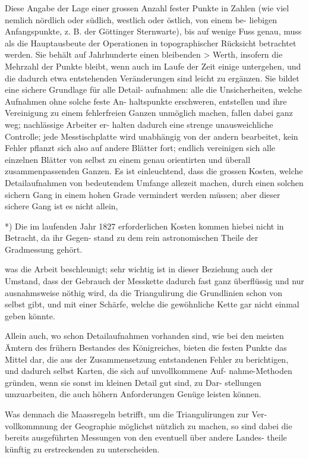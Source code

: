 \documentclass[12pt,a4paper]{article}
\theoremstyle{plain}
\theoremstyle{definition}
\theoremstyle{remark}
\begin{document}
\noindent
Diese Angabe der Lage einer grossen Anzahl fester Punkte in Zahlen
(wie viel nemlich nördlich oder südlich, westlich oder östlich, von einem be-
liebigen Anfangspunkte, z. B. der Göttinger Sternwarte), bis auf wenige
Fuss genau, muss als die Hauptausbeute der Operationen in topographischer
Rücksicht betrachtet werden. Sie behält auf Jahrhunderte einen bleibenden >
Werth, insofern die Mehrzahl der Punkte bleibt, wenn auch im Laufe der
Zeit einige untergehen, und die dadurch etwa entstehenden Veränderungen
sind leicht zu ergänzen. Sie bildet eine sichere Grundlage für alle Detail-
aufnahmen: alle die Unsicherheiten, welche Aufnahmen ohne solche feste An-
haltspunkte erschweren, entstellen und ihre Vereinigung zu einem fehlerfreien
Ganzen unmöglich machen, fallen dabei ganz weg; nachlässige Arbeiter er-
halten dadurch eine strenge unausweichliche Controlle; jede Messtischplatte
wird unabhängig von der andern bearbeitet, kein Fehler pflanzt sich also auf
andere Blätter fort; endlich vereinigen sich alle einzelnen Blätter von selbst
zu einem genau orientirten und überall zusammenpassenden Ganzen. Es ist
einleuchtend, dass die grossen Kosten, welche Detailaufnahmen von bedeutendem
Umfange allezeit machen, durch einen solchen sichern Gang in einem hohen
Grade vermindert werden müssen; aber dieser sichere Gang ist es nicht allein,

\noindent
*) Die im laufenden Jahr 1827 erforderlichen Kosten kommen hiebei nicht in Betracht, da ihr Gegen-
stand zu dem rein astronomischen Theile der Gradmessung gehört.

\noindent

\noindent

\noindent
was die Arbeit beschleunigt; sehr wichtig ist in dieser Beziehung auch der
Umstand, dass der Gebrauch der Messkette dadurch fast ganz überflüssig und
nur ausnahmsweise nöthig wird, da die Triangulirung die Grundlinien schon
von selbst gibt, und mit einer Schärfe, welche die gewöhnliche Kette gar
nicht einmal geben könnte.

\noindent
Allein auch, wo schon Detailaufnahmen vorhanden sind, wie bei den
meisten Ämtern des frühern Bestandes des Königreiches, bieten die festen
Punkte das Mittel dar, die aus der Zusammensetzung entstandenen Fehler zu
berichtigen, und dadurch selbst Karten, die sich auf unvollkommene Auf-
nahme-Methoden gründen, wenn sie sonst im kleinen Detail gut sind, zu Dar-
stellungen umzuarbeiten, die auch höhern Anforderungen Genüge leisten können.

\noindent
Was demnach die Maassregeln betrifft, um die Triangulirungen zur Ver-
vollkommnung der Geographie möglichst nützlich zu machen, so sind dabei
die bereits ausgeführten Messungen von den eventuell über andere Landes-
theile künftig zu erstreckenden zu unterscheiden.
\end{document}
